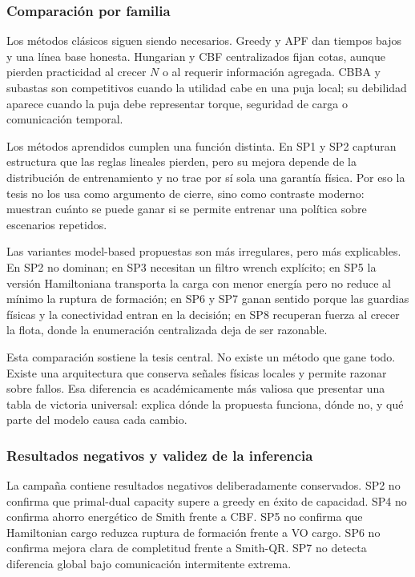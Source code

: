 \subsubsection{Comparación por familia}

Los métodos clásicos siguen siendo necesarios. Greedy y APF dan tiempos bajos y una línea
base honesta. Hungarian y CBF centralizados fijan cotas, aunque pierden practicidad al
crecer $N$ o al requerir información agregada. CBBA y subastas son competitivos cuando
la utilidad cabe en una puja local; su debilidad aparece cuando la puja debe representar
torque, seguridad de carga o comunicación temporal.

Los métodos aprendidos cumplen una función distinta. En SP1 y SP2 capturan estructura que
las reglas lineales pierden, pero su mejora depende de la distribución de entrenamiento y
no trae por sí sola una garantía física. Por eso la tesis no los usa como argumento de
cierre, sino como contraste moderno: muestran cuánto se puede ganar si se permite
entrenar una política sobre escenarios repetidos.

Las variantes model-based propuestas son más irregulares, pero más explicables. En SP2 no
dominan; en SP3 necesitan un filtro wrench explícito; en SP5 la versión Hamiltoniana
transporta la carga con menor energía pero no reduce al mínimo la ruptura de formación;
en SP6 y SP7 ganan sentido porque las guardias físicas y la conectividad entran en la
decisión; en SP8 recuperan fuerza al crecer la flota, donde la enumeración centralizada
deja de ser razonable.

Esta comparación sostiene la tesis central. No existe un método que gane todo. Existe una
arquitectura que conserva señales físicas locales y permite razonar sobre fallos. Esa
diferencia es académicamente más valiosa que presentar una tabla de victoria universal:
explica dónde la propuesta funciona, dónde no, y qué parte del modelo causa cada cambio.

\subsubsection{Resultados negativos y validez de la inferencia}

La campaña contiene resultados negativos deliberadamente conservados. SP2 no confirma que
primal-dual capacity supere a greedy en éxito de capacidad. SP4 no confirma ahorro
energético de Smith frente a CBF. SP5 no confirma que Hamiltonian cargo reduzca ruptura
de formación frente a VO cargo. SP6 no confirma mejora clara de completitud frente a
Smith-QR. SP7 no detecta diferencia global bajo comunicación intermitente extrema.

